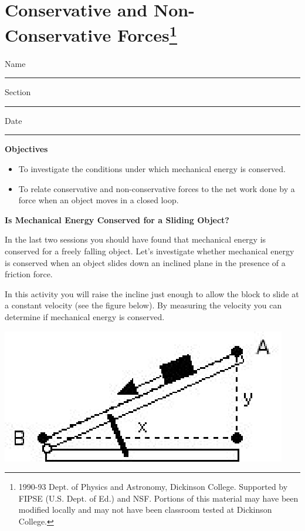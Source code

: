 
\section{Conservative and Non-Conservative Forces\footnote{
1990-93 Dept. of Physics and Astronomy, Dickinson College. Supported by FIPSE
(U.S. Dept. of Ed.) and NSF. Portions of this material may have been modified
locally and may not have been classroom tested at Dickinson College.
}}

Name \rule{2.0in}{0.1pt}\hfill{}Section \rule{1.0in}{0.1pt}\hfill{}Date \rule{1.0in}{0.1pt}

\textbf{Objectives} 

\begin{itemize}
\item To investigate the conditions under which mechanical energy is conserved. 
\item To relate conservative and non-conservative forces to the net work done by a
force when an object moves in a closed loop.
\end{itemize}
\textbf{Is Mechanical Energy Conserved for a Sliding Object? }

In the last two sessions you should have found that mechanical energy is conserved
for a freely falling object. Let's investigate whether mechanical energy is
conserved when an object slides down an inclined plane in the presence of a
friction force.

In this activity you will raise the incline just enough to allow the block to
slide at a constant velocity (see the figure below). By measuring the velocity
you can determine if mechanical energy is conserved.

\vspace{0.3cm}
{\par\centering \includegraphics{conservative/conservative_fig1.eps} \par}
\vspace{0.3cm}

